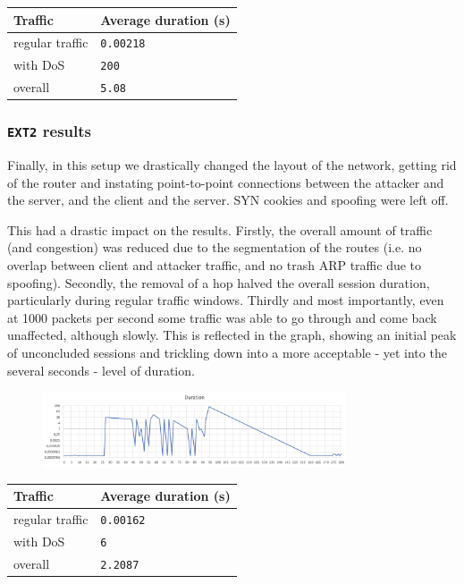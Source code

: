 \documentclass[a4paper,11pt,hidelinks]{article}
\begin{document}
\begin{table}[h!]
  \centering
  \begin{tabular}{|l|l|}
    \hline
    Traffic         & Average duration (s)    \\ \hline
    regular traffic & \verb=0.00218= \\ \hline
    with DoS        & \verb=200= \\ \hline
    overall         & \verb=5.08= \\ \hline
  \end{tabular}
\end{table}

\subsubsection{\texttt{EXT2} results}

Finally, in this setup we drastically changed the layout of the network, getting rid of the router and instating point-to-point connections between the attacker and the server, and the client and the server. SYN cookies and spoofing were left off.

This had a drastic impact on the results. Firstly, the overall amount of traffic (and congestion) was reduced due to the segmentation of the routes (i.e. no overlap between client and attacker traffic, and no trash ARP traffic due to spoofing). Secondly, the removal of a hop halved the overall session duration, particularly during regular traffic windows. Thirdly and most importantly, even at 1000 packets per second some traffic was able to go through and come back unaffected, although slowly. This is reflected in the graph, showing an initial peak of unconcluded sessions and trickling down into a more acceptable - yet into the several seconds - level of duration.

\begin{figure}[h!]
  \centering
  \includegraphics[width=0.8\textwidth]{../drawable/ext2.png}
\end{figure}

\begin{table}[h!]
  \centering
  \begin{tabular}{|l|l|}
    \hline
    Traffic         & Average duration (s)    \\ \hline
    regular traffic & \verb=0.00162= \\ \hline
    with DoS        & \verb=6= \\ \hline
    overall         & \verb=2.2087= \\ \hline
  \end{tabular}
\end{table}

\endgroup
\end{document}
